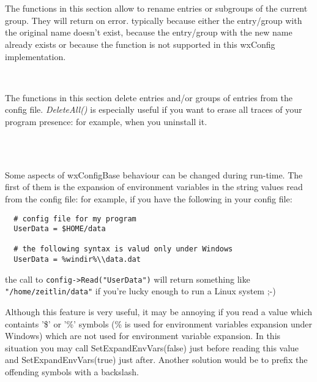 \\
\\


\label{configrenaming}

The functions in this section allow to rename entries or subgroups of the
current group. They will return \false on error. typically because either the
entry/group with the original name doesn't exist, because the entry/group with
the new name already exists or because the function is not supported in this
wxConfig implementation.

\\


\label{configdeleting}

The functions in this section delete entries and/or groups of entries from the
config file. {\it DeleteAll()} is especially useful if you want to erase all
traces of your program presence: for example, when you uninstall it.

\\
\\


\label{configoptions}

Some aspects of wxConfigBase behaviour can be changed during run-time. The
first of them is the expansion of environment variables in the string values
read from the config file: for example, if you have the following in your
config file:

\begin{verbatim}
  # config file for my program
  UserData = $HOME/data

  # the following syntax is valud only under Windows
  UserData = %windir%\\data.dat
\end{verbatim}
the call to {\tt config->Read("UserData")} will return something like
{\tt "/home/zeitlin/data"} if you're lucky enough to run a Linux system ;-)

Although this feature is very useful, it may be annoying if you read a value
which containts '\$' or '\%' symbols (\% is used for environment variables
expansion under Windows) which are not used for environment variable
expansion. In this situation you may call SetExpandEnvVars(false) just before
reading this value and SetExpandEnvVars(true) just after. Another solution
would be to prefix the offending symbols with a backslash.

